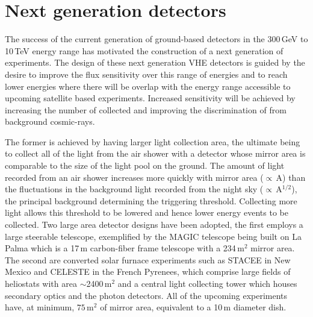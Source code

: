 \chapter{Next generation detectors}
\label{CHAP::VERITAS}


\label{SEC::VERITAS::INTRO}

The success of the current generation of ground-based detectors in the
300\,GeV to 10\,TeV energy range has motivated the construction of a
next generation of experiments. The design of these next generation
VHE \Gray detectors is guided by the desire to improve the flux
sensitivity over this range of energies and to reach lower energies
where there will be overlap with the energy range accessible to
upcoming satellite based experiments. Increased sensitivity will be
achieved by increasing the number of \Grays collected and improving
the discrimination of \Grays from background cosmic-rays.

The former is achieved by having larger light collection area, the
ultimate being to collect all of the light from the air shower with a
detector whose mirror area is comparable to the size of the \Cerenkov
light pool on the ground. The amount of light recorded from an air
shower increases more quickly with mirror area ($\propto$\,A) than the
fluctuations in the background light recorded from the night sky
($\propto$\,A$^{1/2}$), the principal background determining the
triggering threshold. Collecting more light allows this threshold to
be lowered and hence lower energy events to be collected. Two large
area detector designs have been adopted, the first employs a large
steerable telescope, exemplified by the MAGIC telescope
\citep{REF::LORENZ::1996NUCPHYSB} being built on La Palma which is a
17\,m carbon-fiber frame telescope with a 234\,m$^2$ mirror area. The
second are converted solar furnace experiments such as STACEE in New
Mexico \citep{REF::COVAULT::2001HAMBURG} and CELESTE
\citep{REF::CELESTE::1996PROPOSAL} in the French Pyrenees, which
comprise large fields of heliostats with area $\sim$2400\,m$^2$ and a
central light collecting tower which houses secondary optics and the
photon detectors. All of the upcoming experiments have, at minimum,
$75$\,m$^2$ of mirror area, equivalent to a 10\,m diameter dish.

